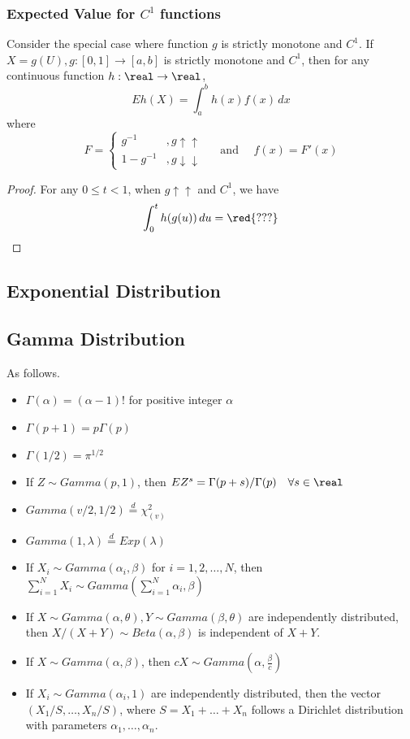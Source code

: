 \documentclass[11pt]{article}
\numberwithin{equation}{section}
\begin{document}
\subsubsection{Expected Value for $C^1$ functions}
Consider the special case where function $g$ is strictly monotone and $C^1$.
\proposition
If $X = g(U), g:[0,1] \rightarrow [a,b]$ is strictly monotone and $C^1$, then for any continuous function $h: \real \rightarrow \real$,
\begin{equation}
	Eh(X) = \int_a^b h(x)f(x) \, dx
\end{equation}
where $$F = \begin{cases}
g^{-1} &, g\uparrow\uparrow\\
1 - g^{-1} &, g\downarrow\downarrow
\end{cases} \quad \text{ and } \quad f(x) = F'(x)$$
\begin{proof}
	For any $0 \leq t < 1$, when $g \uparrow \uparrow$ and $C^1$, we have
	\begin{align}
		\int_0^t h(g(u))\,du = \red{???}
	\end{align}
\end{proof}
\subsection{Exponential Distribution}
\subsection{Gamma Distribution}
\property
As follows.
\begin{itemize}
	\item $\Gamma(\alpha) = (\alpha - 1)!$ for positive integer $\alpha$
	\item $\Gamma(p + 1) = p\Gamma(p)$ 
	\item $\Gamma(1/2) = \pi^{1/2}$
	\item If $Z \sim Gamma(p, 1)$, then $EZ^s = \Gamma(p+s) / \Gamma(p) \quad \forall s\in \real$
	\item $Gamma(v/2, 1/2) \overset{d}{=} \chi^2_{(v)}$
	\item $Gamma(1, \lambda) \overset{d}{=} Exp(\lambda)$
	\item If $X_i \sim Gamma(\alpha_i, \beta)$ for $i = 1, 2, \hdots, N$, then $\sum_{i=1}^N X_i \sim Gamma\left( \sum_{i=1}^N \alpha_i, \beta \right)$
	\item If $X \sim Gamma(\alpha, \theta), Y \sim Gamma(\beta, \theta)$ are independently distributed, then $X / (X+Y) \sim Beta(\alpha, \beta)$ is independent of $X + Y$.
	\item If $X \sim Gamma(\alpha, \beta)$, then $cX \sim Gamma \left( \alpha, \frac{\beta}{c}\right)$
	\item If $X_i \sim Gamma(\alpha_i, 1)$ are independently distributed, then the vector $(X_1 / S, \hdots, X_n / S)$, where $S = X_1 + \hdots + X_n$ follows a Dirichlet distribution with parameters $\alpha_1, \hdots, \alpha_n$.
\end{itemize}
\end{document}
